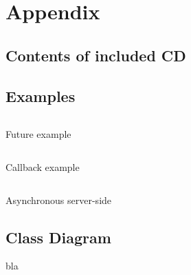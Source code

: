 \documentclass[12pt,final,oneside]{fithesis2}
\begin{document}
\endgroup
\appendix

\chapter{Appendix}

\section{Contents of included CD}
\newpage
\section{Examples}
\begin{listing}[ht]
	\inputminted[]{java}{sources/future.java}
	\caption{Future example}
	\label{future}
\end{listing}
\begin{listing}[ht]
	\inputminted[]{java}{sources/callbackClient.java}
	\caption{Callback example}
	\label{callbackClient}
\end{listing}

\begin{listing}[ht]
	\inputminted[]{java}{sources/todo.java}
	\caption{Asynchronous server-side}
	\label{async-server}
\end{listing}
\newpage
\section{Class Diagram}
bla
\end{document}
